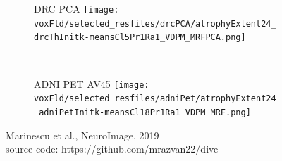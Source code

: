 \begin{frame}
\begin{figure}[h]
  \begin{subfigure}[b]{0.25 \textwidth}
   \centering
   \Large{DRC PCA}
  \texttt{[image: \\voxFld/selected\_resfiles/drcPCA/atrophyExtent24\_drcThInitk-meansCl5Pr1Ra1\_VDPM\_MRFPCA.png]}
  \end{subfigure}
  ~
  \begin{subfigure}[b]{0.25 \textwidth}
   \centering
   \Large{ADNI PET AV45}
  \texttt{[image: \\voxFld/selected\_resfiles/adniPet/atrophyExtent24\_adniPetInitk-meansCl18Pr1Ra1\_VDPM\_MRF.png]}
  \end{subfigure}
  
  \small{Marinescu et al., NeuroImage, 2019}\\
  \small{source code: https://github.com/mrazvan22/dive}

\end{figure}


\end{frame}



